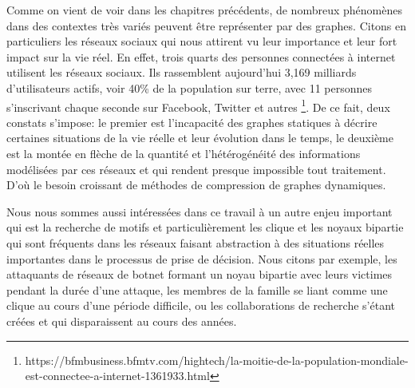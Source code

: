 
Comme on vient de voir dans les chapitres précédents, de nombreux phénomènes dans des contextes très variés peuvent être représenter par des graphes. Citons en particuliers les réseaux sociaux qui nous attirent vu leur importance et leur fort impact sur la vie réel. En effet, trois quarts des personnes connectées à internet utilisent les réseaux sociaux. Ils rassemblent aujourd'hui 3,169 milliards d'utilisateurs actifs, voir 40\% de la population sur terre, avec 11 personnes s'inscrivant chaque seconde sur Facebook, Twitter et autres
\footnote{https://bfmbusiness.bfmtv.com/hightech/la-moitie-de-la-population-mondiale-est-connectee-a-internet-1361933.html}. De ce fait, deux constats s'impose: le premier est l'incapacité des graphes statiques à décrire certaines situations de la vie réelle et leur évolution dans le temps, le deuxième est la montée en flèche de la quantité et l'hétérogénéité des informations modélisées par ces réseaux et qui rendent presque impossible tout traitement. D'où le besoin croissant de méthodes de compression de graphes dynamiques. 

Nous nous sommes aussi intéressées dans ce travail à un autre enjeu important qui est la recherche de motifs et particulièrement les clique et les noyaux bipartie qui sont fréquents dans les réseaux faisant abstraction à des situations réelles importantes dans le processus de prise de décision. Nous citons par exemple, les attaquants de réseaux de botnet formant un noyau bipartie avec leurs victimes pendant la durée d'une attaque, les membres de la famille se liant comme une clique au cours d'une période difficile, ou les collaborations de recherche s'étant créées et qui disparaissent au cours des années.


